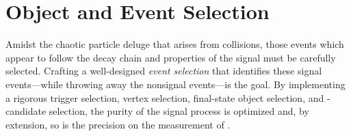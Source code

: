 \section{Object and Event Selection}
\label{sec:evt_sel}
Amidst the chaotic particle deluge that arises from \pp collisions, those events which appear to follow the decay chain and properties of the \hzzfourl signal must be carefully selected.
Crafting a well-designed \emph{event selection} that identifies these signal events---while throwing away the nonsignal events---is the goal.
By implementing a rigorous trigger selection,
vertex selection,
final-state object selection,
and \ZZ-candidate selection,
the purity of the signal process is optimized and, by extension, so is the precision on the measurement of \mH.

